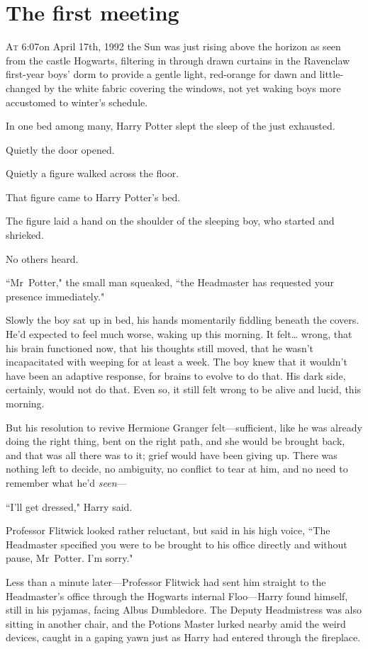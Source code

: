 
\section{The first meeting}

\lettrine{A}{t} 6:07\am on April 17th, 1992 the Sun was just rising above the horizon as seen from the castle Hogwarts, filtering in through drawn curtains in the Ravenclaw first-year boys' dorm to provide a gentle light, red-orange for dawn and little-changed by the white fabric covering the windows, not yet waking boys more accustomed to winter's schedule.

In one bed among many, Harry Potter slept the sleep of the just exhausted.

Quietly the door opened.

Quietly a figure walked across the floor.

That figure came to Harry Potter's bed.

The figure laid a hand on the shoulder of the sleeping boy, who started and shrieked.

No others heard.

``Mr~Potter," the small man squeaked, ``the Headmaster has requested your presence immediately."

Slowly the boy sat up in bed, his hands momentarily fiddling beneath the covers. He'd expected to feel much worse, waking up this morning. It felt{\ldots} wrong, that his brain functioned now, that his thoughts still moved, that he wasn't incapacitated with weeping for at least a week. The boy knew that it wouldn't have been an adaptive response, for brains to evolve to do that. His dark side, certainly, would not do that. Even so, it still felt wrong to be alive and lucid, this morning.

But his resolution to revive Hermione Granger felt—sufficient, like he was already doing the right thing, bent on the right path, and she would be brought back, and that was all there was to it; grief would have been giving up. There was nothing left to decide, no ambiguity, no conflict to tear at him, and no need to remember what he'd \emph{seen}—

``I'll get dressed," Harry said.

Professor Flitwick looked rather reluctant, but said in his high voice, ``The Headmaster specified you were to be brought to his office directly and without pause, Mr~Potter. I'm sorry."

Less than a minute later—Professor Flitwick had sent him straight to the Headmaster's office through the Hogwarts internal Floo—Harry found himself, still in his pyjamas, facing Albus Dumbledore. The Deputy Headmistress was also sitting in another chair, and the Potions Master lurked nearby amid the weird devices, caught in a gaping yawn just as Harry had entered through the fireplace.

